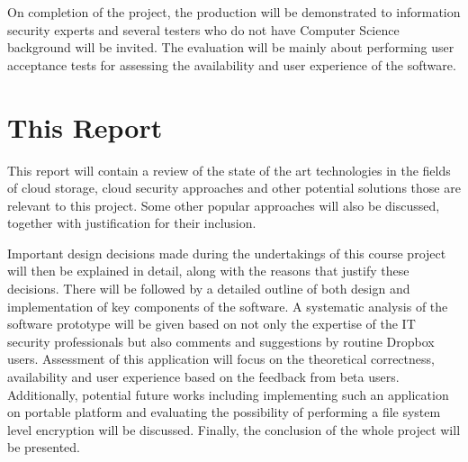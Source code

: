 On completion of the project, the production will be demonstrated to information security experts and several testers who do not have Computer Science background will be invited. The evaluation will be mainly about performing user acceptance tests for assessing the availability and user experience of the software.

\section{This Report}

This report will contain a review of the state of the art technologies in the fields of cloud storage, cloud security approaches and other potential solutions those are relevant to this project. Some other popular approaches will also be discussed, together with justification for their inclusion.

Important design decisions made during the undertakings of this course project will then be explained in detail, along with the reasons that justify these decisions. There will be followed by a detailed outline of both design and implementation of key components of the software. A systematic analysis of the software prototype will be given based on not only the expertise of the IT security professionals but also comments and suggestions by routine Dropbox users. Assessment of this application will focus on the theoretical correctness, availability and user experience based on the feedback from beta users. Additionally, potential future works including implementing such an application on portable platform and evaluating the possibility of performing a file system level encryption will be discussed. Finally, the conclusion of the whole project will be presented.
